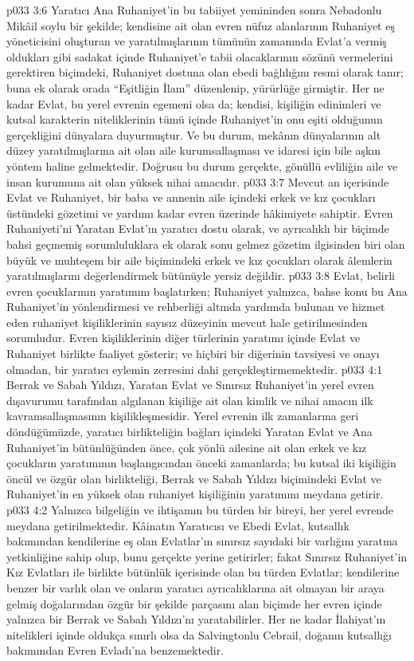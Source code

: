 \vs p033 3:6 Yaratıcı Ana Ruhaniyet’in bu tabiiyet yemininden sonra Nebadonlu Mikâil soylu bir şekilde; kendisine ait olan evren nüfuz alanlarının Ruhaniyet eş yöneticisini oluşturan ve yaratılmışlarının tümünün zamanında Evlat’a vermiş oldukları gibi sadakat içinde Ruhaniyet’e tabii olacaklarının sözünü vermelerini gerektiren biçimdeki, Ruhaniyet dostuna olan ebedi bağlılığını resmi olarak tanır; buna ek olarak orada “Eşitliğin İlanı” düzenlenip, yürürlüğe girmiştir. Her ne kadar Evlat, bu yerel evrenin egemeni olsa da; kendisi, kişiliğin edinimleri ve kutsal karakterin niteliklerinin tümü içinde Ruhaniyet’in onu eşiti olduğunun gerçekliğini dünyalara duyurmuştur. Ve bu durum, mekânın dünyalarının alt düzey yaratılmışlarına ait olan aile kurumsallaşması ve idaresi için bile aşkın yöntem haline gelmektedir. Doğrusu bu durum gerçekte, gönüllü evliliğin aile ve insan kurumuna ait olan yüksek nihai amacıdır.
\vs p033 3:7 Mevcut an içerisinde Evlat ve Ruhaniyet, bir baba ve annenin aile içindeki erkek ve kız çocukları üstündeki gözetimi ve yardımı kadar evren üzerinde hâkimiyete sahiptir. Evren Ruhaniyeti’ni Yaratan Evlat’ın yaratıcı dostu olarak, ve ayrıcalıklı bir biçimde bahsi geçmemiş sorumluluklara ek olarak sonu gelmez gözetim ilgisinden biri olan büyük ve muhteşem bir aile biçimindeki erkek ve kız çocukları olarak âlemlerin yaratılmışlarını değerlendirmek bütünüyle yersiz değildir.
\vs p033 3:8 Evlat, belirli evren çocuklarının yaratımını başlatırken; Ruhaniyet yalnızca, bahse konu bu Ana Ruhaniyet’in yönlendirmesi ve rehberliği altında yardımda bulunan ve hizmet eden ruhaniyet kişiliklerinin sayısız düzeyinin mevcut hale getirilmesinden sorumludur. Evren kişiliklerinin diğer türlerinin yaratımı içinde Evlat ve Ruhaniyet birlikte faaliyet gösterir; ve hiçbiri bir diğerinin tavsiyesi ve onayı olmadan, bir yaratıcı eylemin zerresini dahi gerçekleştirmemektedir.
\vs p033 4:1 Berrak ve Sabah Yıldızı, Yaratan Evlat ve Sınırsız Ruhaniyet’in yerel evren dışavurumu tarafından algılanan kişiliğe ait olan kimlik ve nihai amacın ilk kavramsallaşmasının kişilikleşmesidir. Yerel evrenin ilk zamanlarına geri döndüğümüzde, yaratıcı birlikteliğin bağları içindeki Yaratan Evlat ve Ana Ruhaniyet’in bütünlüğünden önce, çok yönlü ailesine ait olan erkek ve kız çocukların yaratımının başlangıcından önceki zamanlarda; bu kutsal iki kişiliğin öncül ve özgür olan birlikteliği, Berrak ve Sabah Yıldızı biçimindeki Evlat ve Ruhaniyet’in en yüksek olan ruhaniyet kişiliğinin yaratımını meydana getirir.
\vs p033 4:2 Yalnızca bilgeliğin ve ihtişamın bu türden bir bireyi, her yerel evrende meydana getirilmektedir. Kâinatın Yaratıcısı ve Ebedi Evlat, kutsallık bakımından kendilerine eş olan Evlatlar’ın sınırsız sayıdaki bir varlığını yaratma yetkinliğine sahip olup, bunu gerçekte yerine getirirler; fakat Sınırsız Ruhaniyet’in Kız Evlatları ile birlikte bütünlük içerisinde olan bu türden Evlatlar; kendilerine benzer bir varlık olan ve onların yaratıcı ayrıcalıklarına ait olmayan bir araya gelmiş doğalarından özgür bir şekilde parçasını alan biçimde her evren içinde yalnızca bir Berrak ve Sabah Yıldızı’nı yaratabilirler. Her ne kadar İlahiyat’ın nitelikleri içinde oldukça sınırlı olsa da Salvingtonlu Cebrail, doğanın kutsallığı bakımından Evren Evladı’na benzemektedir.
